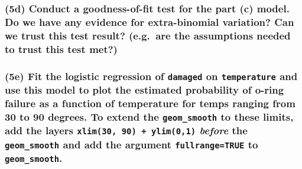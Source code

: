 \documentclass[
]{article}
\begin{document}
\hypertarget{d-conduct-a-goodness-of-fit-test-for-the-part-c-model.-do-we-have-any-evidence-for-extra-binomial-variation-can-we-trust-this-test-result-e.g.-are-the-assumptions-needed-to-trust-this-test-met}{%
\subsubsection{(5d) Conduct a goodness-of-fit test for the part (c)
model. Do we have any evidence for extra-binomial variation? Can we
trust this test result? (e.g.~are the assumptions needed to trust this
test
met?)}\label{d-conduct-a-goodness-of-fit-test-for-the-part-c-model.-do-we-have-any-evidence-for-extra-binomial-variation-can-we-trust-this-test-result-e.g.-are-the-assumptions-needed-to-trust-this-test-met}}

\hypertarget{e-fit-the-logistic-regression-of-damaged-on-temperature-and-use-this-model-to-plot-the-estimated-probability-of-o-ring-failure-as-a-function-of-temperature-for-temps-ranging-from-30-to-90-degrees.-to-extend-the-geom_smooth-to-these-limits-add-the-layers-xlim30-90-ylim01-before-the-geom_smooth-and-add-the-argument-fullrangetrue-to-geom_smooth.}{%
\subsubsection{\texorpdfstring{(5e) Fit the logistic regression of
\texttt{damaged} on \texttt{temperature} and use this model to plot the
estimated probability of o-ring failure as a function of temperature for
temps ranging from 30 to 90 degrees. To extend the \texttt{geom\_smooth}
to these limits, add the layers \texttt{xlim(30,\ 90)\ +\ ylim(0,1)}
\emph{before} the \texttt{geom\_smooth} and add the argument
\texttt{fullrange=TRUE} to
\texttt{geom\_smooth}.}{(5e) Fit the logistic regression of damaged on temperature and use this model to plot the estimated probability of o-ring failure as a function of temperature for temps ranging from 30 to 90 degrees. To extend the geom\_smooth to these limits, add the layers xlim(30, 90) + ylim(0,1) before the geom\_smooth and add the argument fullrange=TRUE to geom\_smooth.}}\label{e-fit-the-logistic-regression-of-damaged-on-temperature-and-use-this-model-to-plot-the-estimated-probability-of-o-ring-failure-as-a-function-of-temperature-for-temps-ranging-from-30-to-90-degrees.-to-extend-the-geom_smooth-to-these-limits-add-the-layers-xlim30-90-ylim01-before-the-geom_smooth-and-add-the-argument-fullrangetrue-to-geom_smooth.}}
\end{document}
